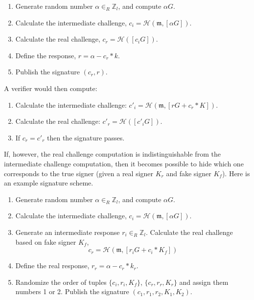\begin{enumerate}
	\item Generate random number $\alpha \in_R \mathbb{Z}_l$, and compute $\alpha G$.

	\item Calculate the intermediate challenge, \(c_i = \mathcal{H}(\mathfrak{m},[\alpha G])\).

	\item Calculate the real challenge, \(c_r = \mathcal{H}([c_i G])\).

	\item Define the response, $r = \alpha - c_r*k$.

	\item Publish the signature $(c_r, r)$.
\end{enumerate}

A verifier would then compute:

\begin{enumerate}
	\item Calculate the intermediate challenge: \(c'_i = \mathcal{H}(\mathfrak{m},[r G + c_r*K])\).

    \item Calculate the real challenge: \(c'_r = \mathcal{H}([c'_i G])\).

	\item If $c_r = c'_r$ then the signature passes.
\end{enumerate}

If, however, the real challenge computation is indistinguishable from the intermediate challenge computation, then it becomes possible to hide which one corresponds to the true signer (given a real signer $K_r$ and fake signer $K_f$). Here is an example signature scheme.

\begin{enumerate}
	\item Generate random number $\alpha \in_R \mathbb{Z}_l$, and compute $\alpha G$.

	\item Calculate the intermediate challenge, \(c_i = \mathcal{H}(\mathfrak{m},[\alpha G])\).
	
	\item Generate an intermediate response $r_i \in_R \mathbb{Z}_l$. Calculate the real challenge based on fake signer $K_f$,\vspace{.115cm}
	\[c_r = \mathcal{H}(\mathfrak{m},[r_i G + c_i*K_f])\]

	\item Define the real response, $r_r = \alpha - c_r*k_r$.

	\item Randomize the order of tuples $\{c_i, r_i, K_f\}$, $\{c_r, r_r, K_r\}$ and assign them numbers 1 or 2. Publish the signature $(c_1, r_1, r_2, K_1, K_2)$.
\end{enumerate}

